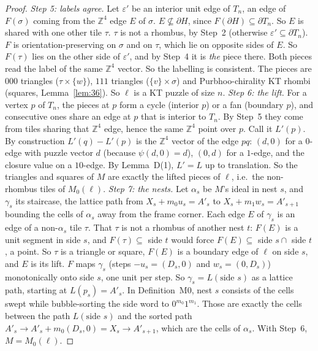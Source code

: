 \documentclass[11pt]{article}
\theoremstyle{definition}\newtheorem{definition}[theorem]{Definition}\newtheorem{remark}[theorem]{Remark}
\newcommand{\Z}{\mathbb Z}\newcommand{\R}{\mathbb R}
\begin{document}
\begin{proof}
\emph{Step 5: labels agree.} Let $\varepsilon'$ be an interior unit edge of $T_n$, an edge of $F(\sigma)$ coming from the $\Z^4$ edge $E$ of $\sigma$. $E\not\subseteq\partial H$, since $F(\partial H)\subseteq\partial T_n$. So $E$ is shared with one other tile $\tau$. $\tau$ is not a rhombus, by Step~2 (otherwise $\varepsilon'\subseteq\partial T_n$). $F$ is orientation-preserving on $\sigma$ and on $\tau$, which lie on opposite sides of $E$. So $F(\tau)$ lies on the other side of $\varepsilon'$, and by Step~4 it is \emph{the} piece there. Both pieces read the label of the same $\Z^4$ vector. So the labelling is consistent. The pieces are $000$ triangles ($\tau\times\{w\}$), $111$ triangles ($\{v\}\times\sigma$) and Purbhoo-chirality KT rhombi (squares, Lemma~\ref{lem:36}). So $\ell$ is a KT puzzle of size $n$.
\emph{Step 6: the lift.} For a vertex $p$ of $T_n$, the pieces at $p$ form a cycle (interior $p$) or a fan (boundary $p$), and consecutive ones share an edge at $p$ that is interior to $T_n$. By Step~5 they come from tiles sharing that $\Z^4$ edge, hence the same $\Z^4$ point over $p$. Call it $L'(p)$. By construction $L'(q)-L'(p)$ is the $\Z^4$ vector of the edge $pq$: $(d,0)$ for a $0$-edge with puzzle vector $d$ (because $\psi(d,0)=d$), $(0,d)$ for a $1$-edge, and the closure value on a $10$-edge. By Lemma~D(1), $L'=L$ up to translation. So the triangles and squares of $M$ are exactly the lifted pieces of $\ell$, i.e.\ the non-rhombus tiles of $M_0(\ell)$.
\emph{Step 7: the nests.} Let $\alpha_s$ be $M$'s ideal in nest $s$, and $\gamma_s$ its staircase, the lattice path from $X_s+m_0u_s=A'_s$ to $X_s+m_1w_s=A'_{s+1}$ bounding the cells of $\alpha_s$ away from the frame corner. Each edge $E$ of $\gamma_s$ is an edge of a non-$\alpha_s$ tile $\tau$. That $\tau$ is not a rhombus of another nest $t$: $F(E)$ is a unit segment in side $s$, and $F(\tau)\subseteq$ side $t$ would force $F(E)\subseteq$ side $s\cap$ side $t$, a point. So $\tau$ is a triangle or square, $F(E)$ is a boundary edge of $\ell$ on side $s$, and $E$ is its lift. $F$ maps $\gamma_s$ (steps $-u_s=(D_s,0)$ and $w_s=(0,D_s)$) monotonically onto side $s$, one unit per step. So $\gamma_s=L(\text{side } s)$ as a lattice path, starting at $L(p_s)=A'_s$. In Definition~M0, nest $s$ consists of the cells swept while bubble-sorting the side word to $0^{m_0}1^{m_1}$. Those are exactly the cells between the path $L(\text{side }s)$ and the sorted path $A'_s\to A'_s+m_0(D_s,0)=X_s\to A'_{s+1}$, which are the cells of $\alpha_s$. With Step~6, $M=M_0(\ell)$.
\end{proof}
\end{document}

